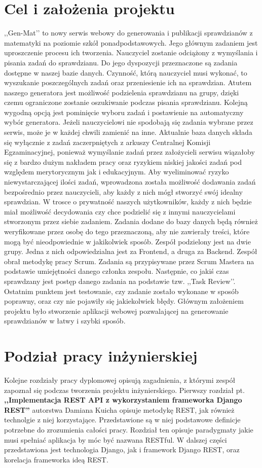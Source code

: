\documentclass[oneside,polski,logo,indent]{amuthesis}
\begin{document}
\section{Cel i założenia projektu}

,,Gen-Mat’’ to nowy serwis webowy do generowania i publikacji sprawdzianów z matematyki na poziomie szkół ponadpodstawowych. Jego głównym zadaniem jest uproszczenie procesu ich tworzenia. Nauczyciel zostanie odciążony z wymyślania i pisania zadań do sprawdzianu. Do jego dyspozycji przeznaczone są zadania dostępne w naszej bazie danych. Czynność, którą nauczyciel musi wykonać, to wyszukanie poszczególnych zadań oraz przeniesienie ich na sprawdzian.
Atutem naszego generatora jest możliwość podzielenia sprawdzianu na grupy, dzięki czemu ograniczone zostanie oszukiwanie podczas pisania sprawdzianu.
Kolejną wygodną opcją jest pominięcie wyboru zadań i postawienie na automatyczny wybór generatora. Jeżeli nauczycielowi nie spodobają się zadania wybrane przez serwis, może je w każdej chwili zamienić na inne.
Aktualnie baza danych składa się wyłącznie z zadań zaczerpniętych z arkuszy Centralnej Komisji Egzaminacyjnej, ponieważ wymyślanie zadań przez założycieli serwisu wiązałoby się z bardzo dużym nakładem pracy oraz ryzykiem niskiej jakości zadań pod względem merytorycznym jak i edukacyjnym.
Aby wyeliminować ryzyko niewystarczającej ilości zadań, wprowadzona została możliwość dodawania zadań bezpośrednio przez nauczycieli, aby każdy z nich mógł stworzyć swój idealny sprawdzian. W trosce o prywatność naszych użytkowników, każdy z nich będzie miał możliwość decydowania czy chce podzielić się z innymi nauczycielami stworzonym przez siebie zadaniem. Zadania dodane do bazy danych będą również weryfikowane przez osobę do tego przeznaczoną, aby nie zawierały treści, które mogą być nieodpowiednie w jakikolwiek sposób.
Zespół podzielony jest na dwie grupy. Jedna z nich odpowiedzialna jest za Frontend, a druga za Backend. Zespół obrał metodykę pracy Scrum. Zadania są przypisywane przez Scrum Mastera na podstawie umiejętności danego członka zespołu. Następnie, co jakiś czas sprawdzany jest postęp danego zadania na podstawie tzw. ,,Task Review’’. Ostatnim punktem jest testowanie, czy zadanie zostało wykonane w sposób poprawny, oraz czy nie pojawiły się jakiekolwiek błędy.
Głównym założeniem projektu było stworzenie aplikacji webowej pozwalającej na generowanie sprawdzianów w łatwy i szybki sposób.

\section{Podział pracy inżynierskiej}
Kolejne rozdziały pracy dyplomowej opisują zagadnienia, z którymi zespół zapoznał się podczas tworzenia projektu inżynierskiego.
Pierwszy rozdział pt. \textbf{,,Implementacja REST API z wykorzystaniem frameworka Django REST''} autorstwa Damiana Kuicha opisuje metodykę REST, jak również technolgie z niej korzystające. Przedstawione są w niej podstawowe definicje potrzebne do zrozumienia całości pracy. Rozdział ten opisuje paradygmaty jakie musi spełniać aplikacja by móc być nazwana RESTful. W dalszej części przedstawiona jest technologia Django, jak i framework Django REST, oraz korelacja frameworka ideą REST. 
\end{document}
